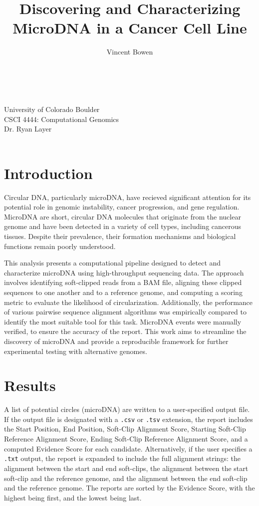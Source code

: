 \documentclass[11pt, letterpaper]{article}
\makeatletter
\newcommand{\university}[1]{\def\@university{#1}}
\newcommand{\prof}[1]{\def\@prof{#1}}
\newcommand{\course}[1]{\def\@course{#1}}
\def\@university{}
\def\@prof{}
\def\@course{}
\renewcommand\maketitle{
{\raggedright
\begin{center}
{\Large \@title }\\[1ex] 
{\@author }\\[1ex]
{\@university }\\[3ex]
{\@course}\\[1ex]
{\@prof }\\[1ex]
\@date\\[8ex]
\end{center}}}
\makeatother
\begin{document}
\title{Discovering and Characterizing MicroDNA in a Cancer Cell Line}
\author{Vincent Bowen}
\university{University of Colorado Boulder}
\course{CSCI 4444: Computational Genomics}
\prof{Dr. Ryan Layer}
\maketitle


\section{Introduction}
Circular DNA, particularly microDNA, have recieved significant attention for its potential role in genomic instability, cancer progression, and gene regulation. MicroDNA are short, circular DNA molecules that originate from the nuclear genome and have been detected in a variety of cell types, including cancerous tissues. Despite their prevalence, their formation mechanisms and biological functions remain poorly understood. 

This analysis presents a computational pipeline designed to detect and characterize microDNA using high-throughput sequencing data. The approach involves identifying soft-clipped reads from a BAM file, aligning these clipped sequences to one another and to a reference genome, and computing a scoring metric to evaluate the likelihood of circularization. Additionally, the performance of various pairwise sequence alignment algorithms was empirically compared to identify the most suitable tool for this task. MicroDNA events were manually verified, to ensure the accuracy of the report. This work aims to streamline the discovery of microDNA and provide a reproducible framework for further experimental testing with alternative genomes.


\section{Results}
A list of potential circles (microDNA) are written to a user-specified output file. If the output file is designated with a \verb|.csv| or \verb|.tsv| extension, the report includes the Start Position, End Position, Soft-Clip Alignment Score, Starting Soft-Clip Reference Alignment Score, Ending Soft-Clip Reference Alignment Score, and a computed Evidence Score for each candidate. Alternatively, if the user specifies a \verb|.txt| output, the report is expanded to include the full alignment strings: the alignment between the start and end soft-clips, the alignment between the start soft-clip and the reference genome, and the alignment between the end soft-clip and the reference genome. The reports are sorted by the Evidence Score, with the highest being first, and the lowest being last. 
\end{document}
